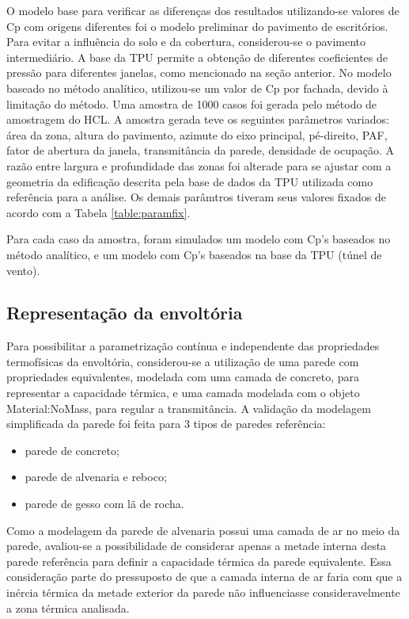 \documentclass[brazil,hardcopy,openany,a5paper]{ufscthesis}
\begin{document}
		O modelo base para verificar as diferenças dos resultados utilizando-se valores de Cp com origens diferentes foi o modelo preliminar do pavimento de escritórios. Para evitar a influência do solo e da cobertura, considerou-se o pavimento intermediário. A base da TPU permite a obtenção de diferentes coeficientes de pressão para diferentes janelas, como mencionado na seção anterior. No modelo baseado no método analítico, utilizou-se um valor de Cp por fachada, devido à limitação do método. Uma amostra de 1000 casos foi gerada pelo método de amostragem do HCL. A amostra gerada teve os seguintes parâmetros variados: área da zona, altura do pavimento, azimute do eixo principal, pé-direito, PAF, fator de abertura da janela, transmitância da parede, densidade de ocupação. A razão entre largura e profundidade das zonas foi alterade para se ajustar com a geometria da edificação descrita pela base de dados da TPU utilizada como referência para a análise. Os demais parâmtros tiveram seus valores fixados de acordo com a Tabela \ref{table:paramfix}.
				
		Para cada caso da amostra, foram simulados um modelo com Cp’s baseados no método analítico, e um modelo com Cp’s baseados na base da TPU (túnel de vento).
		
		\subsection{Representação da envoltória}
		
		Para possibilitar a parametrização contínua e independente das propriedades termofísicas da envoltória, considerou-se a utilização de uma parede com propriedades equivalentes, modelada com uma camada de concreto, para representar a capacidade térmica, e uma camada modelada com o objeto Material:NoMass, para regular a transmitância.
		A validação da modelagem simplificada da parede foi feita para 3 tipos de paredes referência:
		
		\begin{itemize}
			\item parede de concreto;
			\item parede de alvenaria e reboco;
			\item parede de gesso com lã de rocha.
		\end{itemize}
		
		Como a modelagem da parede de alvenaria possui uma camada de ar no meio da parede, avaliou-se a possibilidade de considerar apenas a metade interna desta parede referência para definir a capacidade térmica da parede equivalente. Essa consideração parte do pressuposto de que a camada interna de ar faria com que a inércia térmica da metade exterior da parede não influenciasse consideravelmente a zona térmica analisada.
		
\end{document}
